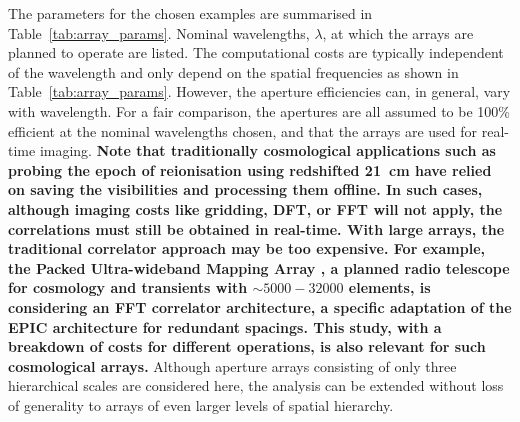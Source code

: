 \documentclass[
  journal=pasa,
  manuscript=article-type,
  year=2020,
  volume=37,
]{cup-journal}
\begin{document}
The parameters for the chosen examples are summarised in Table~\ref{tab:array_params}. Nominal wavelengths, $\lambda$, at which the arrays are planned to operate are listed. The computational costs are typically independent of the wavelength and only depend on the spatial frequencies as shown in Table~\ref{tab:array_params}. However, the aperture efficiencies can, in general, vary with wavelength. For a fair comparison, the apertures are all assumed to be 100\% efficient at the nominal wavelengths chosen, and that the arrays are used for real-time imaging. \textbf{Note that traditionally cosmological applications such as probing the epoch of reionisation using redshifted 21~cm have relied on saving the visibilities and processing them offline. In such cases, although imaging costs like gridding, DFT, or FFT will not apply, the correlations must still be obtained in real-time. With large arrays, the traditional correlator approach may be too expensive. For example, the Packed Ultra-wideband Mapping Array \citep[PUMA;][]{PUMA+2019}, a planned radio telescope for cosmology and transients with $\sim 5000-32000$ elements, is considering an FFT correlator architecture, a specific adaptation of the EPIC architecture for redundant spacings. This study, with a breakdown of costs for different operations, is also relevant for such cosmological arrays.} Although aperture arrays consisting of only three hierarchical scales are considered here, the analysis can be extended without loss of generality to arrays of even larger levels of spatial hierarchy.
\end{document}
